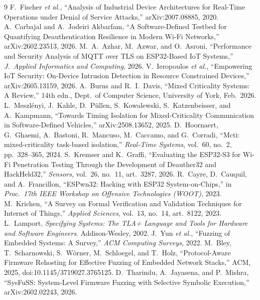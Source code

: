 \begin{thebibliography}{9}
\small
{} F.\ Fischer \emph{et al.}, ``Analysis of Industrial Device Architectures
for Real-Time Operations under Denial of Service Attacks,'' arXiv:2007.08885, 2020.
 A.\ Carbajal and A.\ Jodeiri Akbarfam, ``A Software-Defined Testbed for
Quantifying Deauthentication Resilience in Modern Wi-Fi Networks,'' arXiv:2602.23513, 2026.
 M.\ A.\ Azhar, M.\ Azwar, and O.\ Asroni, ``Performance and Security
Analysis of MQTT over TLS on ESP32-Based IoT Systems,'' \emph{J.\ Applied Informatics and
Computing}, 2026.
 V.\ Ieropoulos \emph{et al.}, ``Empowering IoT Security: On-Device
Intrusion Detection in Resource Constrained Devices,'' arXiv:2605.13159, 2026.
 A.\ Burns and R.\ I.\ Davis, ``Mixed Criticality Systems: A Review,''
14th edn., Dept.\ of Computer Science, University of York, Feb.\ 2026.
 L.\ Meszl\'enyi, J.\ Kahle, D.\ P\"ullen, S.\ Kowalewski,
S.\ Katzenbeisser, and A.\ Kampmann, ``Towards Timing Isolation for Mixed-Criticality
Communication in Software-Defined Vehicles,'' arXiv:2508.13652, 2025.
 D.\ Hoornaert, G.\ Ghaemi, A.\ Bastoni, R.\ Mancuso, M.\ Caccamo, and
G.\ Corradi, ``Mcti: mixed-criticality task-based isolation,'' \emph{Real-Time Systems},
vol.\ 60, no.\ 2, pp.\ 328--365, 2024.
 S.\ Kremser and K.\ Graffi, ``Evaluating the ESP32-S3 for Wi-Fi
Penetration Testing Through the Development of Deauther32 and HackHeld32,'' \emph{Sensors},
vol.\ 26, no.\ 11, art.\ 3287, 2026.
 R.\ Cayre, D.\ Cauquil, and A.\ Francillon, ``ESPwn32: Hacking with ESP32
System-on-Chips,'' in \emph{Proc.\ 17th IEEE Workshop on Offensive Technologies (WOOT)}, 2023.
 M.\ Krichen, ``A Survey on Formal Verification and Validation Techniques
for Internet of Things,'' \emph{Applied Sciences}, vol.\ 13, no.\ 14, art.\ 8122, 2023.
 L.\ Lamport, \emph{Specifying Systems: The TLA+ Language and Tools for
Hardware and Software Engineers}. Addison-Wesley, 2002.
 J.\ Yun \emph{et al.}, ``Fuzzing of Embedded Systems: A Survey,''
\emph{ACM Computing Surveys}, 2022.
 M.\ Bley, T.\ Scharnowski, S.\ W\"orner, M.\ Schloegel, and T.\ Holz,
``Protocol-Aware Firmware Rehosting for Effective Fuzzing of Embedded Network Stacks,'' ACM,
2025, doi:10.1145/3719027.3765125.
 D.\ Tharindu, A.\ Jayasena, and P.\ Mishra, ``SysFuSS: System-Level
Firmware Fuzzing with Selective Symbolic Execution,'' arXiv:2602.02243, 2026.

\end{thebibliography}
